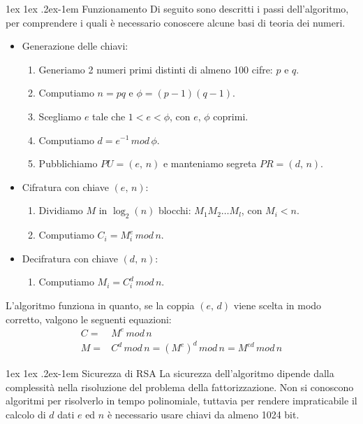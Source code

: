 \documentclass[a4paper, 11pt, twoside, openright, fleqn]{report}
\makeatletter
\renewcommand{\paragraph}{%
	\@startsection{paragraph}{4}%
	{\z@}{1ex \@plus 1ex \@minus .2ex}{-1em}%
	{\normalfont\normalsize\bfseries}%
}
\makeatother
\begin{document}
\paragraph{Funzionamento}
Di seguito sono descritti i passi dell'algoritmo, per comprendere i quali è necessario conoscere alcune basi di teoria dei numeri.
\begin{itemize}
	\item Generazione delle chiavi:
	\begin{enumerate}
		\item Generiamo 2 numeri primi distinti di almeno 100 cifre: $p$ e $q$.
		\item Computiamo $n=pq$ e $\phi=(p-1)(q-1)$.
		\item Scegliamo $e$ tale che $1<e<\phi$, con $e,\,\phi$ coprimi.
		\item Computiamo $d=e^{-1}\,mod\,\phi$.
		\item Pubblichiamo $PU = (e,\,n)$ e manteniamo segreta $PR = (d,\,n)$.
	\end{enumerate}
	\item Cifratura con chiave $(e,\,n)$:
	\begin{enumerate}
		\item Dividiamo $M$ in $\log_2(n)$ blocchi: $M_1M_2\dots M_l$, con $M_i < n$.
		\item Computiamo $C_i = M_i^e\,mod\,n$.
	\end{enumerate}
	\item Decifratura con chiave $(d,\,n)$:
	\begin{enumerate}
		\item Computiamo $M_i = C_i^d\,mod\,n$.
	\end{enumerate}
\end{itemize}
L'algoritmo funziona in quanto, se la coppia $(e,\,d)$ viene scelta in modo corretto, valgono le seguenti equazioni:
\begin{align*}
	C =& M^e\,mod\,n\\
	M =& C^d\,mod\,n = (M^e)^d\,mod\,n = M^{ed}\,mod\,n
\end{align*}

\paragraph{Sicurezza di RSA}
La sicurezza dell'algoritmo dipende dalla complessità nella risoluzione del problema della fattorizzazione. Non si conoscono algoritmi per risolverlo in tempo polinomiale, tuttavia per rendere impraticabile il calcolo di $d$ dati $e$ ed $n$ è necessario usare chiavi da almeno 1024 bit.
\end{document}
